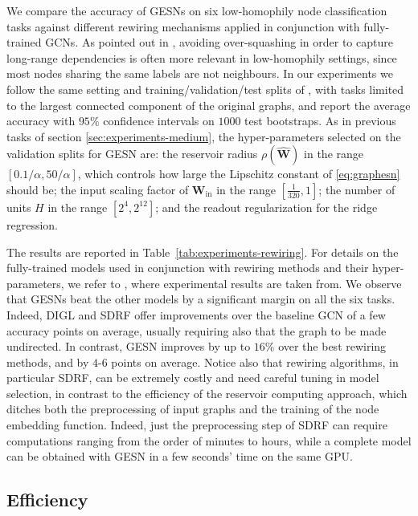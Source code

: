 \documentclass[final,5p,times,twocolumn]{elsarticle}
\begin{document}
We compare the accuracy of GESNs on six low-homophily node classification tasks against different rewiring mechanisms applied in conjunction with fully-trained GCNs.
As pointed out in \cite{Topping2022}, avoiding over-squashing in order to capture long-range dependencies is often more relevant in low-homophily settings, since most nodes sharing the same labels are not neighbours.
In our experiments we follow the same setting and training/validation/test splits of \cite{Gasteiger2019,Topping2022}, with tasks limited to the largest connected component of the original graphs, and report the average accuracy with $95\%$ confidence intervals on $1000$ test bootstraps.
As in previous tasks of section \ref{sec:experiments-medium}, the hyper-parameters selected on the validation splits for GESN are: the reservoir radius $\rho(\mathbf{\hat{W}})$ in the range $[0.1/\alpha,50/\alpha]$, which controls how large the Lipschitz constant of \eqref{eq:graphesn} should be; the input scaling factor of $\mathbf{W}_{\mathrm{in}}$ in the range $[\frac{1}{320},1]$; the number of units $H$ in the range $[2^4,2^{12}]$; and the readout regularization for the ridge regression.

The results are reported in Table~\ref{tab:experiments-rewiring}.
For details on the fully-trained models used in conjunction with rewiring methods and their hyper-parameters, we refer to \cite{Topping2022}, where experimental results are taken from.
We observe that GESNs beat the other models by a significant margin on all the six tasks.
Indeed, DIGL and SDRF offer improvements over the baseline GCN of a few accuracy points on average, usually requiring also that the graph to be made undirected.
In contrast, GESN improves by up to $16\%$ over the best rewiring methods, and by $4$-$6$ points on average.
Notice also that rewiring algorithms, in particular SDRF, can be extremely costly and need careful tuning in model selection, in contrast to the efficiency of the reservoir computing approach, which ditches both the preprocessing of input graphs and the training of the node embedding function.
Indeed, just the preprocessing step of SDRF can require computations ranging from the order of minutes to hours, while a complete model can be obtained with GESN in a few seconds' time on the same GPU.

\subsection{Efficiency}
\end{document}
